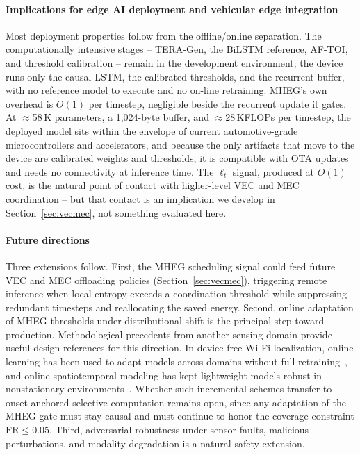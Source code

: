 \documentclass[a4paper,fleqn]{cas-dc}
\newcommand{\TERAGen}{\mbox{TERA-Gen}\xspace}
\newcommand{\AFTOI}{\mbox{AF-TOI}\xspace}
\newcommand{\MHEG}{\mbox{MHEG}\xspace}
\begin{document}
\paragraph{Implications for edge AI deployment and vehicular edge integration}
Most deployment properties follow from the offline/online separation. The computationally intensive stages -- \TERAGen, the BiLSTM reference, \AFTOI, and threshold calibration -- remain in the development environment; the device runs only the causal LSTM, the
calibrated thresholds, and the recurrent buffer, with no reference model to execute
and no on-line retraining. \MHEG's own overhead is $O(1)$ per timestep, negligible
beside the recurrent update it gates. At $\approx$58\,K parameters, a 1,024-byte
buffer, and $\approx$28\,KFLOPs per timestep, the deployed model sits within the
envelope of current automotive-grade microcontrollers and accelerators, and because
the only artifacts that move to the device are calibrated weights and thresholds, it
is compatible with OTA updates and needs no connectivity at inference time. The
$\ell_t$ signal, produced at $O(1)$ cost, is the natural point of contact with
higher-level VEC and MEC coordination -- but that contact is an implication we
develop in Section~\ref{sec:vecmec}, not something evaluated here.
\paragraph{Future directions}
Three extensions follow. First, the \MHEG scheduling signal could feed future VEC
and MEC offloading policies (Section~\ref{sec:vecmec}), triggering remote
inference when local entropy exceeds a coordination threshold while suppressing
redundant timesteps and reallocating the saved energy. Second, online adaptation
of \MHEG thresholds under distributional shift is the principal step toward
production. {\color{\revcolor}Methodological precedents from another sensing
domain provide useful design references for this direction. In device-free \mbox{Wi-Fi}
localization, online learning has been used to adapt models across domains
without full retraining~\cite{zhang2025leveraging}, and online spatiotemporal
modeling has kept lightweight models robust in nonstationary
environments~\cite{zhang2023spatiotemporal}. Whether such incremental schemes
transfer to onset-anchored selective computation remains open, since any
adaptation of the \MHEG gate must stay causal and must continue to honor the
coverage constraint $\mathrm{FR}\le0.05$.} Third, adversarial robustness under sensor faults, malicious
perturbations, and modality degradation is a natural safety extension.
\end{document}
